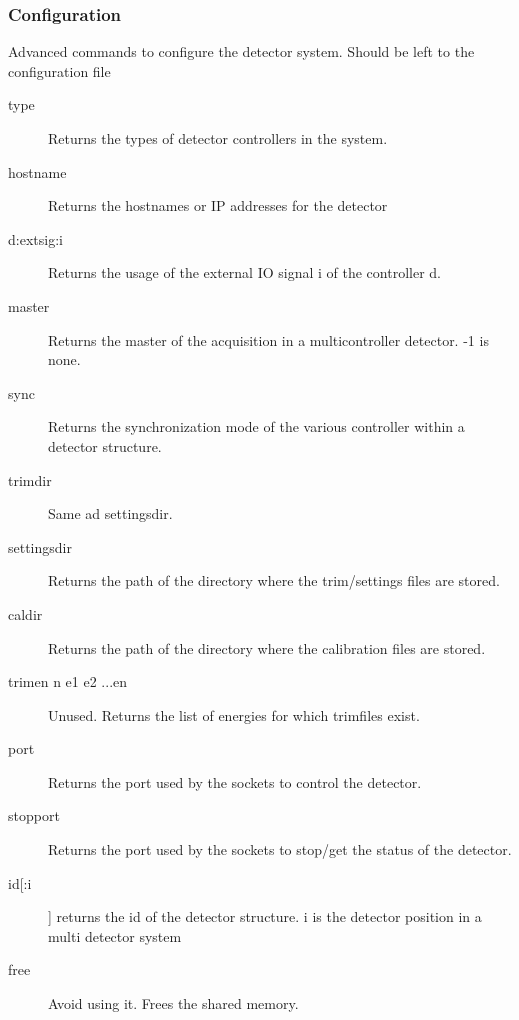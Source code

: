 \documentclass{article}
\begin{document}
\subsubsection{Configuration}
Advanced commands to configure the detector system. Should be left to the configuration file
\begin{description}
\item[type] Returns the types of detector controllers in the system. 
\item[hostname] Returns the hostnames or IP addresses for the detector
\item[d:extsig:i] Returns the usage of the external IO signal i of the controller d.
\item[master] Returns the master of the acquisition in a multicontroller detector. -1 is none.
\item[sync] Returns the synchronization mode of the various controller within a detector structure. 
\item[trimdir] Same ad settingsdir.
\item[settingsdir] Returns the path of the directory where the trim/settings files are stored.
\item[caldir]   Returns the path of the directory where the calibration files are stored. 
\item[trimen n e1 e2 ...en] Unused. Returns the list of energies for which trimfiles exist.
\item[port] Returns the port used by the sockets to control the detector. 
\item[stopport]Returns the port used by the sockets to stop/get the status of the detector.
\item[id[:i]]        returns the id of the detector structure. i is the detector position in a multi detector system
\item[free]  Avoid using it. Frees the shared memory. 
\end{description}
\end{document}
